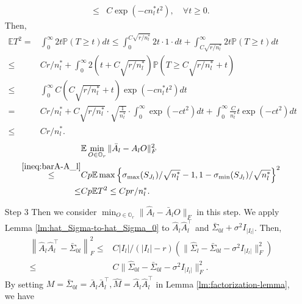 \documentclass[11pt]{article}
\newcommand{\0}{{\mathbf{0}}}
\newcommand{\1}{{\mathbf{1}}}
\begin{document}
\begin{enumerate}[leftmargin=*]
\begin{equation}
\begin{split}
	\leq & C\exp(-cn_l^\ast t^2),\quad \forall t\geq 0.
	\end{split}
	\end{equation}
	Then,
	\begin{equation*}
	\begin{split}
	\mathbb{E}T^2 = & \int_{0}^\infty 2t\mathbb{P}(T\geq t)dt \leq \int_0^{C\sqrt{r/n_l^\ast}} 2t \cdot 1 \cdot dt + \int_{C\sqrt{r/n_l^\ast}}^\infty 2t\mathbb{P}\left(T \geq t\right)dt\\
	\leq & Cr/n_l^\ast + \int_{0}^\infty 2\left(t + C\sqrt{r/n_l^\ast}\right)\mathbb{P}\left(T\geq C\sqrt{r/n_l^\ast} + t\right) \\
	\leq & \int_0^\infty C\left(C\sqrt{r/n_l^\ast} + t\right)\exp(-cn_l^\ast t^2)dt\\
	= & Cr/n_l^\ast + C\sqrt{r/n_l^\ast} \cdot \sqrt{\frac{1}{n_l^\ast}} \cdot \int_{0}^\infty \exp(-ct^2)dt + \int_0^\infty \frac{C}{n_l^\ast} t\exp(-ct^2)dt\\
	\leq & Cr/n_l^\ast.
	\end{split}
	\end{equation*}
	\begin{equation}\label{ineq:bar-A-AO}
	\begin{split}
	& \mathbb{E}\min_{O\in \mathbb{O}_r} \|\bar{A}_l - A_lO\|_F^2 \\
	\overset{\eqref{ineq:barA-A_l}}{\leq} & Cp\mathbb{E}\max\left\{\sigma_{\max}(S_{J_l})/\sqrt{n_l^\ast} - 1, 1 - \sigma_{\min}(S_{J_l})/\sqrt{n_l^\ast}\right\}^2 \\
	\leq & Cp\mathbb{E}T^2 \leq Cpr/n_l^\ast.
	\end{split}
	\end{equation}
	\item[Step 3] Then we consider $\min_{O\in \mathbb{O}_r}\|\hat{A}_l - \bar{A}_lO\|_F$ in this step. We apply Lemma \ref{lm:hat_Sigma-to-hat_Sigma_0} to $\hat{A}_l\hat{A}_l^\top$ and $\bar{\Sigma}_{0l}+\sigma^2 I_{|I_l|}$. Then,
	\begin{equation}\label{ineq:Step3-1}
	\begin{split}
	\left\|\hat{A}_l\hat{A}_l^\top - \bar{\Sigma}_{0l}\right\|_F^2 \leq & C|I_l|/(|I_l|-r)\left(\|\hat{\Sigma}_l - \bar{\Sigma}_{0l} - \sigma^2I_{|I_l|}\|_F^2\right)\\
	\leq  & C\|\hat{\Sigma}_{0l} - \bar{\Sigma}_{0l} - \sigma^2I_{|I_l|}\|_F^2. 
	\end{split}
	\end{equation}
	By setting $M = \bar{\Sigma}_{0l} = \bar{A}_l\bar{A}_l^\top, \hat{M} = \hat{A}_l\hat{A}_l^\top$ in Lemma \ref{lm:factorization-lemma}, we have

\end{enumerate}
\end{document}
